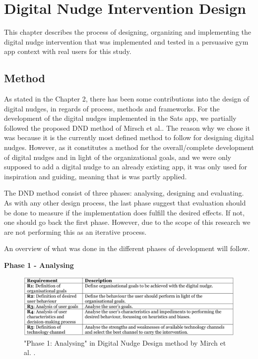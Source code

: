 \chapter{Digital Nudge Intervention Design}
This chapter describes the process of designing, organizing and implementing the digital nudge intervention that was implemented and tested in a persuasive gym app context with real users for this study. 

\section{Method} 
As stated in the Chapter 2, there has been some contributions into the design of digital nudges, in regards of process, methods and frameworks. For the development of the digital nudges implemented in the Sats app, we partially followed the proposed DND method of Mirsch et al.\cite{mirsch_making_2018}. The reason why we chose it was because it is the currently most defined method to follow for designing digital nudges. However, as it constitutes a method for the overall/complete development of digital nudges and in light of the organizational goals, and we were only supposed to add a digital nudge to an already existing app, it was only used for inspiration and guiding, meaning that is was partly applied. 

The DND method consist of three phases: analysing, designing and evaluating. As with any other design process, the last phase suggest that evaluation should be done to measure if the implementation does fulfill the desired effects. If not, one should go back the first phase. However, due to the scope of this research we are not performing this as an iterative process. 

An overview of what was done in the different phases of development will follow. 

\bigbreak

\textbf{Phase 1 - Analysing}

\bigbreak
\begin{figure}
\includegraphics[width=1\textwidth]{images/Phase1.png}
\caption{"Phase 1: Analysing" in Digital Nudge Design method by Mirch et al. \cite{mirsch_making_2018}.}
\end{figure}
\bigbreak

